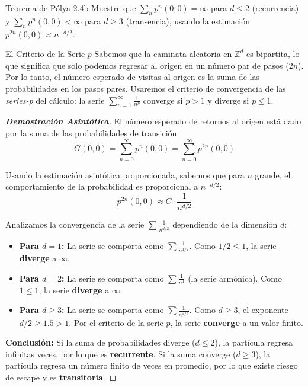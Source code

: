 \documentclass[10pt,a4paper]{article}
\begin{document}
\newpage

\begin{ejercicio}{Teorema de Pólya }{2.4b}
    Muestre que $\sum_n p^n(0,0) = \infty$ para $d \le 2$ (recurrencia) y $\sum_n p^n(0,0) < \infty$ para $d \ge 3$ (transencia), usando la estimación $p^{2n}(0,0) \asymp n^{-d/2}$.
\end{ejercicio}

\vspace{2mm}

\begin{nota}{El Criterio de la Serie-$p$}
    Sabemos que la caminata aleatoria en $\mathbb{Z}^d$ es bipartita, lo que significa que solo podemos regresar al origen en un número par de pasos ($2n$). Por lo tanto, el número esperado de visitas al origen es la suma de las probabilidades en los pasos pares. 
    Usaremos el criterio de convergencia de las \textit{series-p} del cálculo: la serie $\sum_{n=1}^\infty \frac{1}{n^p}$ converge si $p > 1$ y diverge si $p \le 1$.
\end{nota}

\begin{proof}[\textbf{Demostración Asintótica}]
    El número esperado de retornos al origen está dado por la suma de las probabilidades de transición:
    \[ G(0,0) = \sum_{n=0}^{\infty} p^n(0,0) = \sum_{n=0}^{\infty} p^{2n}(0,0) \]
    
    Usando la estimación asintótica proporcionada, sabemos que para $n$ grande, el comportamiento de la probabilidad es proporcional a $n^{-d/2}$:
    \[ p^{2n}(0,0) \approx C \cdot \frac{1}{n^{d/2}} \]
    
    Analizamos la convergencia de la serie $\sum \frac{1}{n^{d/2}}$ dependiendo de la dimensión $d$:
    \begin{itemize}
        \item \textbf{Para $d = 1$:} La serie se comporta como $\sum \frac{1}{n^{1/2}}$. Como $1/2 \le 1$, la serie \textbf{diverge} a $\infty$.
        \item \textbf{Para $d = 2$:} La serie se comporta como $\sum \frac{1}{n^1}$ (la serie armónica). Como $1 \le 1$, la serie \textbf{diverge} a $\infty$.
        \item \textbf{Para $d \ge 3$:} La serie se comporta como $\sum \frac{1}{n^{d/2}}$. Como $d \ge 3$, el exponente $d/2 \ge 1.5 > 1$. Por el criterio de la serie-$p$, la serie \textbf{converge} a un valor finito.
    \end{itemize}
    
    \textbf{Conclusión:} 
    Si la suma de probabilidades diverge ($d \le 2$), la partícula regresa infinitas veces, por lo que es \textbf{recurrente}. Si la suma converge ($d \ge 3$), la partícula regresa un número finito de veces en promedio, por lo que existe riesgo de escape y es \textbf{transitoria}.
\end{proof}
\end{document}
